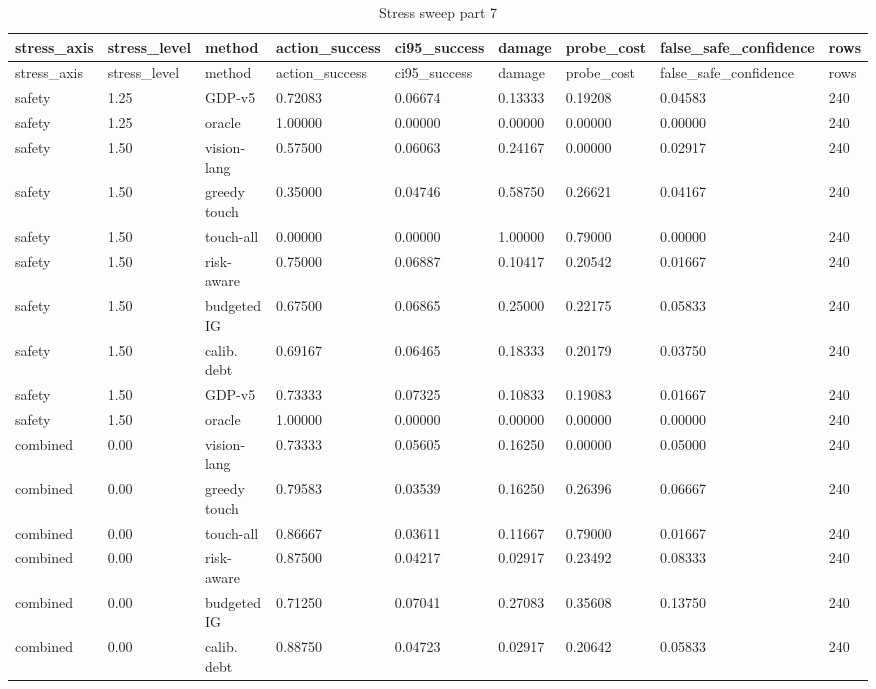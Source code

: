 \documentclass{article}
\begin{document}
\begin{center}
\tiny
\renewcommand{\arraystretch}{0.92}
\setlength{\tabcolsep}{3pt}
\begin{longtable}{lllllllll}
\caption{Stress sweep part 7}\label{tab:stress-sweep-7}\\
\toprule
stress\_axis & stress\_level & method & action\_success & ci95\_success & damage & probe\_cost & false\_safe\_confidence & rows \\
\midrule
\endfirsthead
\toprule
stress\_axis & stress\_level & method & action\_success & ci95\_success & damage & probe\_cost & false\_safe\_confidence & rows \\
\midrule
\endhead
safety & 1.25 & GDP-v5 & 0.72083 & 0.06674 & 0.13333 & 0.19208 & 0.04583 & 240 \\
safety & 1.25 & oracle & 1.00000 & 0.00000 & 0.00000 & 0.00000 & 0.00000 & 240 \\
safety & 1.50 & vision-lang & 0.57500 & 0.06063 & 0.24167 & 0.00000 & 0.02917 & 240 \\
safety & 1.50 & greedy touch & 0.35000 & 0.04746 & 0.58750 & 0.26621 & 0.04167 & 240 \\
safety & 1.50 & touch-all & 0.00000 & 0.00000 & 1.00000 & 0.79000 & 0.00000 & 240 \\
safety & 1.50 & risk-aware & 0.75000 & 0.06887 & 0.10417 & 0.20542 & 0.01667 & 240 \\
safety & 1.50 & budgeted IG & 0.67500 & 0.06865 & 0.25000 & 0.22175 & 0.05833 & 240 \\
safety & 1.50 & calib. debt & 0.69167 & 0.06465 & 0.18333 & 0.20179 & 0.03750 & 240 \\
safety & 1.50 & GDP-v5 & 0.73333 & 0.07325 & 0.10833 & 0.19083 & 0.01667 & 240 \\
safety & 1.50 & oracle & 1.00000 & 0.00000 & 0.00000 & 0.00000 & 0.00000 & 240 \\
combined & 0.00 & vision-lang & 0.73333 & 0.05605 & 0.16250 & 0.00000 & 0.05000 & 240 \\
combined & 0.00 & greedy touch & 0.79583 & 0.03539 & 0.16250 & 0.26396 & 0.06667 & 240 \\
combined & 0.00 & touch-all & 0.86667 & 0.03611 & 0.11667 & 0.79000 & 0.01667 & 240 \\
combined & 0.00 & risk-aware & 0.87500 & 0.04217 & 0.02917 & 0.23492 & 0.08333 & 240 \\
combined & 0.00 & budgeted IG & 0.71250 & 0.07041 & 0.27083 & 0.35608 & 0.13750 & 240 \\
combined & 0.00 & calib. debt & 0.88750 & 0.04723 & 0.02917 & 0.20642 & 0.05833 & 240 \\

\end{longtable}
\end{center}
\end{document}
